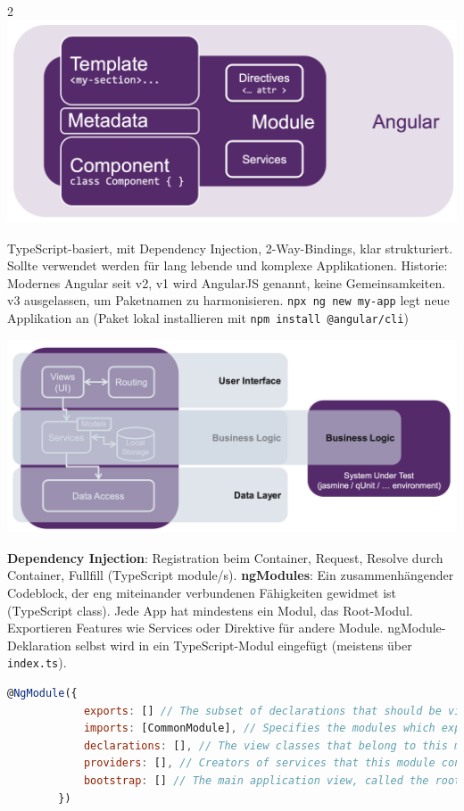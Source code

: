 \documentclass[10pt,landscape]{article}
\begin{document}
\begin{multicols}{2}
        \includegraphics[width=\linewidth]{base_angular}

        TypeScript-basiert, mit Dependency Injection, 2-Way-Bindings, klar strukturiert.
        Sollte verwendet werden für lang lebende und komplexe Applikationen.
        Historie: Modernes Angular seit v2, v1 wird AngularJS genannt, keine Gemeinsamkeiten.
        v3 ausgelassen, um Paketnamen zu harmonisieren.
        \lstinline{npx ng new my-app} legt neue Applikation an (Paket lokal installieren mit \lstinline{npm install @angular/cli})

        \includegraphics[width=\linewidth]{angular_logical_layers}

        \textbf{Dependency Injection}: Registration beim Container, Request, Resolve durch Container, Fullfill (TypeScript module/s).
        \textbf{ngModules}: Ein zusammenhängender Codeblock, der eng miteinander verbundenen Fähigkeiten gewidmet ist (TypeScript class).
        Jede App hat mindestens ein Modul, das Root-Modul.
        Exportieren Features wie Services oder Direktive für andere Module.
        ngModule-Deklaration selbst wird in ein TypeScript-Modul eingefügt (meistens über \lstinline{index.ts}).

        \begin{lstlisting}[language=JavaScript]
        @NgModule({
            exports: [] // The subset of declarations that should be visible and usable in the component templates of other modules.
            imports: [CommonModule], // Specifies the modules which exports/providers should be imported into this module.
            declarations: [], // The view classes that belong to this module (components, directives and pipes).
            providers: [], // Creators of services that this module contributes to the global collection of services (Dependency Injection Container); they become accessible in all parts of the app.
            bootstrap: [] // The main application view, called the root component. Only the root module should set this property.
        })


\end{lstlisting}
\end{multicols}
\end{document}
